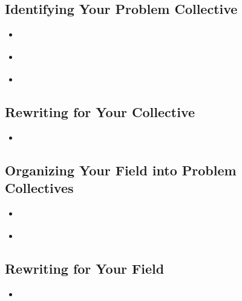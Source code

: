 \documentclass[11pt]{article}
\begin{document}
\subsection{Identifying Your Problem Collective}
\begin{itemize}
\item  \begin{exercise}
\end{exercise}

\vspace{20pt}
\item  \begin{exercise}
\end{exercise}

\vspace{20pt}
\item  \begin{exercise}
\end{exercise}
\end{itemize}
\subsection{Rewriting for Your Collective}
\begin{itemize}
\item \begin{exercise}
\end{exercise}
\end{itemize}
\subsection{Organizing Your Field into Problem Collectives}
\begin{itemize}
\item \begin{exercise}
\end{exercise}

\vspace{20pt}
\item  \begin{exercise}
\end{exercise} 
\end{itemize}
\subsection{Rewriting for Your Field}
\begin{itemize}
\item \begin{exercise}
\end{exercise} 
\end{itemize}
\end{document}

